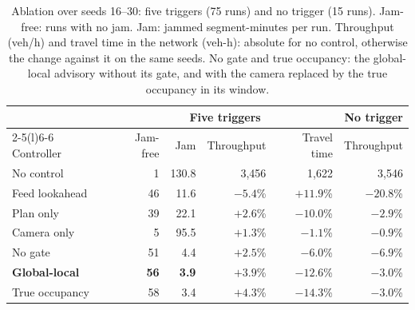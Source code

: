 \begin{table}[t]
\centering
\caption{Ablation over seeds 16--30: five triggers (75 runs) and no trigger (15 runs). Jam-free: runs with no jam. Jam: jammed segment-minutes per run. Throughput (veh/h) and travel time in the network (veh-h): absolute for no control, otherwise the change against it on the same seeds. No gate and true occupancy: the global-local advisory without its gate, and with the camera replaced by the true occupancy in its window.}
\label{tab:main}
\footnotesize
\setlength{\tabcolsep}{2.2pt}
\begin{tabular}{@{}lrrrrr@{}}
\toprule
 & \multicolumn{4}{c}{Five triggers} & No trigger \\
\cmidrule(lr){2-5}\cmidrule(l){6-6}
Controller & Jam-free & Jam & Throughput & Travel time & Throughput \\
\midrule
No control & 1 & 130.8 & 3,456 & 1,622 & 3,546 \\
Feed lookahead & 46 & 11.6 & $-5.4$\% & $+11.9$\% & $-20.8$\% \\
Plan only & 39 & 22.1 & $+2.6$\% & $-10.0$\% & $-2.9$\% \\
Camera only & 5 & 95.5 & $+1.3$\% & $-1.1$\% & $-0.9$\% \\
No gate & 51 & 4.4 & $+2.5$\% & $-6.0$\% & $-6.9$\% \\
\textbf{Global-local} & \textbf{56} & \textbf{3.9} & $\mathbf{+3.9}$\% & $\mathbf{-12.6}$\% & $\mathbf{-3.0}$\% \\
True occupancy & 58 & 3.4 & $+4.3$\% & $-14.3$\% & $-3.0$\% \\
\bottomrule
\end{tabular}
\end{table}
